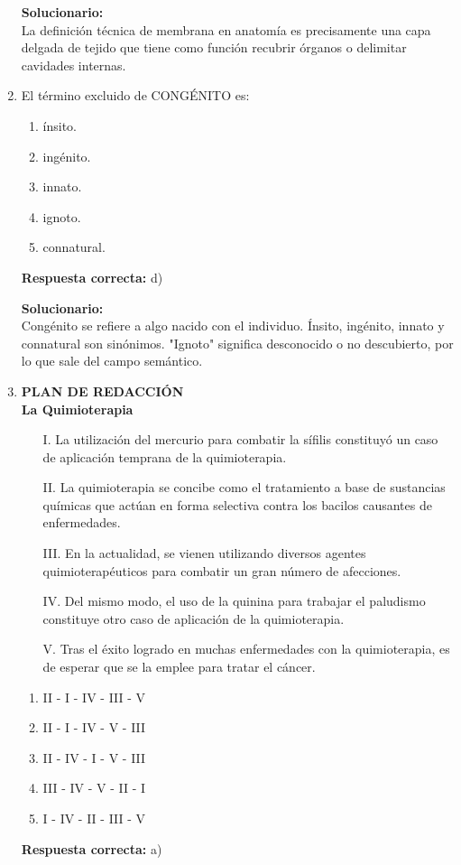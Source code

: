 \begin{enumerate}
	\vspace{2mm}
	\textbf{Solucionario:}\\
	La definición técnica de membrana en anatomía es precisamente una capa delgada de tejido que tiene como función recubrir órganos o delimitar cavidades internas.
	
	\vspace{6mm}
	
	\item El término excluido de CONGÉNITO es:
	\begin{enumerate}[label=\alph*)]
		\item ínsito.
		\item ingénito.
		\item innato.
		\item ignoto.
		\item connatural.
	\end{enumerate}
	\textbf{Respuesta correcta:} d)
	
	\vspace{2mm}
	\textbf{Solucionario:}\\
	Congénito se refiere a algo nacido con el individuo. Ínsito, ingénito, innato y connatural son sinónimos. "Ignoto" significa desconocido o no descubierto, por lo que sale del campo semántico.
	
	\vspace{6mm}
	
	\item \textbf{PLAN DE REDACCIÓN}\\
	\textbf{La Quimioterapia}
	\begin{itemize}
		\item[I.] La utilización del mercurio para combatir la sífilis constituyó un caso de aplicación temprana de la quimioterapia.
		\item[II.] La quimioterapia se concibe como el tratamiento a base de sustancias químicas que actúan en forma selectiva contra los bacilos causantes de enfermedades.
		\item[III.] En la actualidad, se vienen utilizando diversos agentes quimioterapéuticos para combatir un gran número de afecciones.
		\item[IV.] Del mismo modo, el uso de la quinina para trabajar el paludismo constituye otro caso de aplicación de la quimioterapia.
		\item[V.] Tras el éxito logrado en muchas enfermedades con la quimioterapia, es de esperar que se la emplee para tratar el cáncer.
	\end{itemize}
	\begin{enumerate}[label=\alph*)]
		\item II - I - IV - III - V
		\item II - I - IV - V - III
		\item II - IV - I - V - III
		\item III - IV - V - II - I
		\item I - IV - II - III - V
	\end{enumerate}
	\textbf{Respuesta correcta:} a)
	

\end{enumerate}
